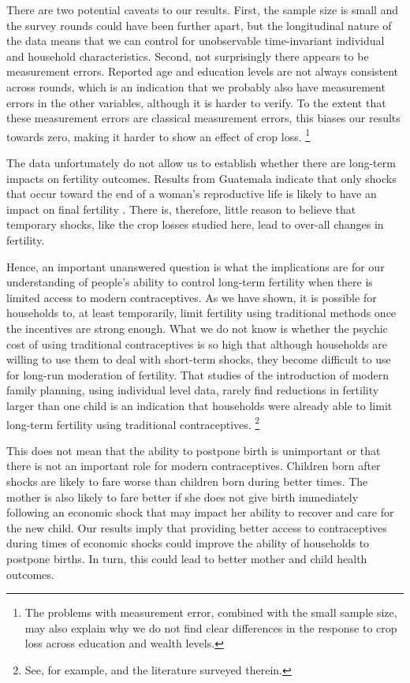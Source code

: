 \documentclass[letterpaper,12pt]{article}
\begin{document}
There are two potential caveats to our results.
First, the sample size is small and the survey rounds
could have been further apart, but the longitudinal nature
of the data means that we can control for unobservable 
time-invariant individual and household characteristics.
Second, not surprisingly there appears to be measurement 
errors.
Reported age and education levels are not always consistent
across rounds, which is an indication that we probably also
have measurement errors in the other variables, although it is
harder to verify.
To the extent that these measurement errors are classical 
measurement errors, this biases our results towards zero,
making it harder to show an effect of crop loss.%
\footnote{
The problems with measurement error, combined with the small
sample size, may also explain why we do not find clear
differences in the response to crop loss across education
and wealth levels.
}

The data unfortunately do not allow us to establish whether there 
are long-term impacts on fertility outcomes.
Results from Guatemala indicate that only shocks that occur 
toward the end of a woman's reproductive life is likely to have an 
impact on final fertility \citep{Portner2014}.
There is, therefore, little reason to believe that temporary shocks,
like the crop losses studied here, lead to over-all changes in fertility.

Hence, an important unanswered question is what the implications
are for our understanding of people's ability to control long-term
fertility when there is limited access to modern contraceptives.
As we have shown, it is possible for households to, at least temporarily, 
limit fertility using traditional methods once the incentives are
strong enough.
What we do not know is whether the psychic cost of using traditional 
contraceptives is so high that although households are willing to use 
them to deal with short-term shocks, they become difficult to use for 
long-run moderation of fertility.
That studies of the introduction of modern family planning, using individual
level data, rarely find reductions in fertility larger than one child
is an indication that households were already able to limit long-term 
fertility using traditional contraceptives.%
\footnote{
See, for example, \cite{Portner2014a} and the literature surveyed therein.
}

This does not mean that the ability to postpone birth is unimportant
or that there is not an important role for modern contraceptives.
Children born after shocks are likely to fare worse than children born 
during better times.
The mother is also likely to fare better if she does not give birth 
immediately following an economic shock that may impact her ability 
to recover and care for the new child.
Our results imply that providing better access to contraceptives 
during times of economic shocks could improve the ability of households 
to postpone births.
In turn, this could lead to better mother and child health outcomes.
\end{document}

